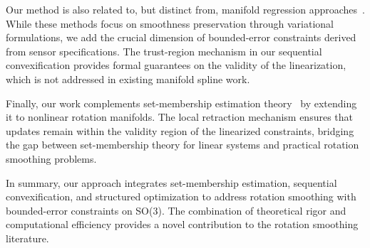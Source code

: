 Our method is also related to, but distinct from, manifold regression approaches~\cite{tzoufas,forsetti}. While these methods focus on smoothness preservation through variational formulations, we add the crucial dimension of bounded-error constraints derived from sensor specifications. The trust-region mechanism in our sequential convexification provides formal guarantees on the validity of the linearization, which is not addressed in existing manifold spline work.

Finally, our work complements set-membership estimation theory~\cite{springest} by extending it to nonlinear rotation manifolds. The local retraction mechanism ensures that updates remain within the validity region of the linearized constraints, bridging the gap between set-membership theory for linear systems and practical rotation smoothing problems.

In summary, our approach integrates set-membership estimation, sequential convexification, and structured optimization to address rotation smoothing with bounded-error constraints on SO(3). The combination of theoretical rigor and computational efficiency provides a novel contribution to the rotation smoothing literature.
